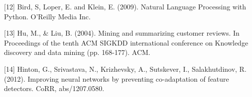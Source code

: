 \documentclass{article} %
\begin{document}
{[12] Bird, S, Loper, E. and Klein, E. (2009). Natural Language Processing with Python. O'Reilly Media Inc.

[13] Hu, M., \& Liu, B. (2004). Mining and summarizing customer reviews. In Proceedings of the tenth ACM SIGKDD international conference on Knowledge discovery and data mining (pp. 168-177). ACM.


[14] Hinton, G., Srivastava, N., Krizhevsky, A., Sutskever, I., Salakhutdinov, R. (2012). Improving neural networks by preventing co-adaptation of feature detectors. CoRR, abs/1207.0580.








%
%



}
\end{document}
